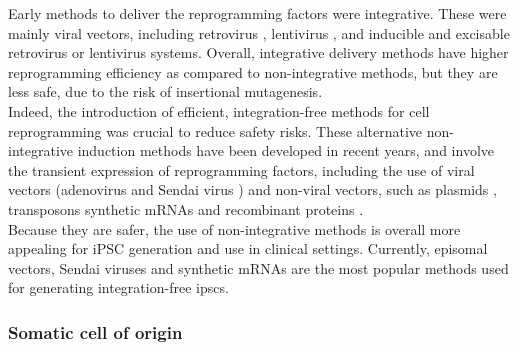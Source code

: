 Early methods to deliver the reprogramming factors were integrative.
These were mainly viral vectors, including retrovirus \cite{takahashi2006induction, takahashi2007induction, wernig2007vitro, okita2007generation, yamanaka2007strategies, maherali2007directly}, lentivirus \cite{yu2007induced, blelloch2007generation}, and 
inducible and 
excisable retrovirus \cite{soldner2009parkinson} or
lentivirus \cite{maherali2008high} systems. 
Overall, integrative delivery methods have higher reprogramming efficiency as compared to non-integrative methods, but they are less safe, due to the risk of insertional mutagenesis. \\

Indeed, the introduction of efficient, integration-free methods for cell reprogramming was crucial to reduce safety risks. 
These alternative non-integrative induction methods have been developed in recent years, and involve the transient expression of reprogramming factors, including the use of viral vectors (adenovirus \cite{stadtfeld2008reprogramming} and Sendai virus \cite{fusaki2009efficient, nishimura2011development}) and non-viral vectors, such as plasmids \cite{yu2009human, okita2008generation, okita2011more, jia2010nonviral}, transposons \cite{kaji2009virus, woltjen2009piggybac, yu2009human} synthetic mRNAs \cite{warren2010highly} and recombinant proteins \cite{kim2009generation}. \\

Because they are safer, the use of non-integrative methods is overall more appealing for iPSC generation and use in clinical settings.
Currently, episomal vectors, Sendai viruses and synthetic mRNAs are the most popular methods used for generating integration-free \glspl{ipsc}. 




\subsubsection{Somatic cell of origin}
\label{sec:ipsc_somatic_cell}

